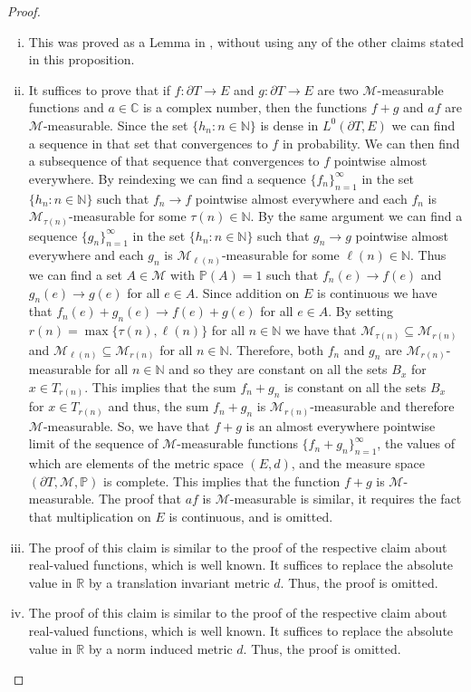 \documentclass[twoside, 11pt]{article}
\newcommand{\R}{\mathbb{R}}
\newcommand{\C}{\mathbb{C}}
\newcommand{\N}{\mathbb{N}}
\renewcommand{\P}{\mathbb{P}}
\theoremstyle{plain}
\theoremstyle{definition}
\begin{document}
\begin{proof}
\begin{enumerate}[(i)]
\item This was proved as a Lemma in \cite{BIEHLER2}, without using any of the other claims stated in this proposition.

\item It suffices to prove that if $f:\partial T\to E$ and $g: \partial T \to E$ are two $\mathcal{M}$-measurable functions and $a \in \C$ is a complex number, then the functions $f + g$ and $af$ are $\mathcal{M}$-measurable.
Since the set $\{h_n : n \in \N\}$ is dense in $L^0(\partial T, E)$ we can find a sequence in that set that convergences to $f$ in probability.
We can then find a subsequence of that sequence that convergences to $f$ pointwise almost everywhere.
By reindexing we can find a sequence $\{f_n\}_{n=1}^{\infty}$ in the set $\{h_n : n \in \N\}$ such that $f_n \to f$ pointwise almost everywhere and each $f_n$ is $\mathcal{M}_{\tau(n)}$-measurable for some $\tau(n) \in \N$.
By the same argument we can find a sequence $\{g_n\}_{n=1}^{\infty}$ in the set $\{h_n : n \in \N\}$ such that $g_n \to g$ pointwise almost everywhere and each $g_n$ is $\mathcal{M}_{\ell(n)}$-measurable for some $\ell(n) \in \N$.
Thus we can find a set $A \in \mathcal{M}$ with $\P(A) = 1$ such that $f_n(e) \to f(e)$ and $g_n(e) \to g(e)$ for all $e \in A$.
Since addition on $E$ is continuous we have that $f_n(e) + g_n(e) \to f(e) + g(e)$ for all $e \in A$.
By setting $r(n) = \max\{\tau(n), \ell(n)\}$ for all $n \in \N$ we have that $\mathcal{M}_{\tau(n)} \subseteq \mathcal{M}_{r(n)} $ and $\mathcal{M}_{\ell(n)} \subseteq \mathcal{M}_{r(n)}$ for all $n \in \N$.
Therefore, both $f_n$ and $g_n$ are $\mathcal{M}_{r(n)}$-measurable for all $n \in \N$ and so they are constant on all the sets $B_x$ for $x \in T_{r(n)}$.
This implies that the sum $f_n + g_n$ is constant on all the sets $B_x$ for $x \in T_{r(n)}$ and thus, the sum $f_n +g_n$ is $\mathcal{M}_{r(n)}$-measurable and therefore $\mathcal{M}$-measurable.
So, we have that $f + g$ is an almost everywhere pointwise limit of the sequence of $\mathcal{M}$-measurable functions $\{f_n + g_n\}_{n=1}^{\infty}$, the values of which are elements of the metric space $(E,d)$, and the measure space $(\partial T, \mathcal{M}, \P)$ is complete.
This implies that the function $f+g$ is $\mathcal{M}$-measurable.
The proof that $af$ is $\mathcal{M}$-measurable is similar, it requires the fact that multiplication on $E$ is continuous, and is omitted.

\item The proof of this claim is similar to the proof of the respective claim about real-valued functions, which is well known.
It suffices to replace the absolute value in $\R$ by a translation invariant metric $d$. Thus, the proof is omitted.

\item The proof of this claim is similar to the proof of the respective claim about real-valued functions, which is well known.
It suffices to replace the absolute value in $\R$ by a norm induced metric $d$.
Thus, the proof is omitted.
\end{enumerate}
\end{proof}
\end{document}
